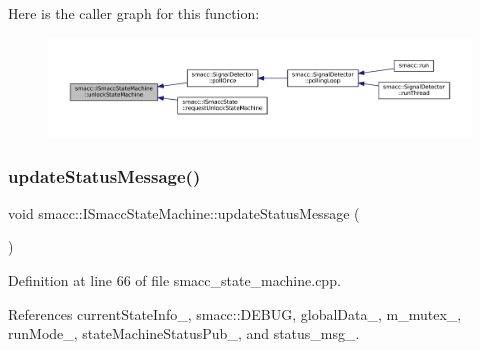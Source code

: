 Here is the caller graph for this function\+:
\nopagebreak
\begin{figure}[H]
\begin{center}
\leavevmode
\includegraphics[width=350pt]{classsmacc_1_1ISmaccStateMachine_ae2e3ceb87bfe3f9d8bf320e36071fdc7_icgraph}
\end{center}
\end{figure}
\mbox{\label{classsmacc_1_1ISmaccStateMachine_ad246a49015fadaeb0b1639d7ab99f7d0}} 
\subsubsection{\texorpdfstring{update\+Status\+Message()}{updateStatusMessage()}}
{\footnotesize\ttfamily void smacc\+::\+I\+Smacc\+State\+Machine\+::update\+Status\+Message (\begin{DoxyParamCaption}{ }\end{DoxyParamCaption})}



Definition at line 66 of file smacc\+\_\+state\+\_\+machine.\+cpp.



References current\+State\+Info\+\_\+, smacc\+::\+D\+E\+B\+UG, global\+Data\+\_\+, m\+\_\+mutex\+\_\+, run\+Mode\+\_\+, state\+Machine\+Status\+Pub\+\_\+, and status\+\_\+msg\+\_\+.


